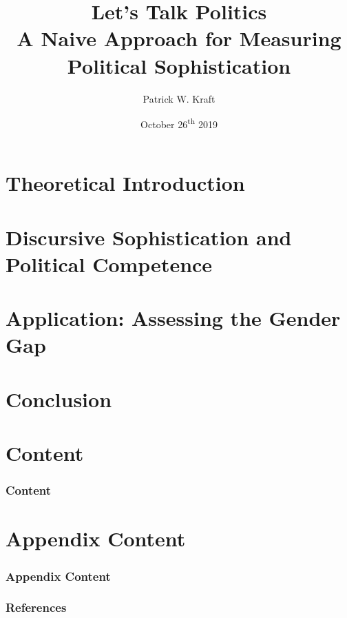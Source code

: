 \documentclass{beamer}
\author{Patrick W. Kraft}
\title{Let's Talk Politics\\
{\large A Naive Approach for Measuring Political Sophistication}}
\institute{Zurich Text as Data Conference}
\date{October 26\textsuperscript{th} 2019}
\begin{document}
\section{Theoretical Introduction}
\frame{\titlepage}


\section{Discursive Sophistication and Political Competence}


\section{Application: Assessing the Gender Gap}


\section{Conclusion}


\section*{Content}
\label{sec:main-content}
\begin{frame}%
\frametitle{Content}
\tableofcontents %
\end{frame}

\appendix
\section*{Appendix Content}
\label{sec:appendix-content}
\begin{frame}%
\frametitle{Appendix Content}
\small\tableofcontents %
\end{frame}


\begin{frame} %
  \frametitle{References}
  \def\newblock{\hskip .11em plus .33em minus .07em}
  \begin{scriptsize}
    
    
  \end{scriptsize}
\end{frame}
\end{document}
